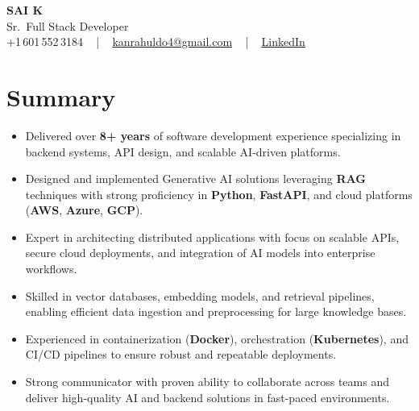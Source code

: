 \documentclass[letterpaper,11pt]{article}
\newcommand{\resumeItem}[1]{
  \item\footnotesize{
    {#1 \vspace{-2pt}}
  }
}
\newcommand{\resumeItemListStart}{\begin{itemize}[leftmargin=*]}
\newcommand{\resumeItemListEnd}{\end{itemize}\vspace{-5pt}}
\begin{document}
\begin{center}
    {\fontsize{14pt}{12pt}\selectfont \textbf{\MakeUppercase{Sai K}}}\\ \vspace{2pt}
    \fontsize{10pt}{12pt}\selectfont Sr.\ Full Stack Developer\\ \vspace{2pt}
    \fontsize{10pt}{12pt}\selectfont +1\,601\,552\,3184 ~ | ~
    \href{mailto:kanrahuldo4@gmail.com}{kanrahuldo4@gmail.com} ~ | ~
    \href{https://www.linkedin.com/in/srrrk/}{\color{blue}\underline{LinkedIn}}
    \vspace{-10pt}
\end{center}

\section{Summary}
\fontsize{9pt}{10pt}\selectfont
\resumeItemListStart
  \resumeItem{Delivered over \textbf{8+ years} of software development experience specializing in backend systems, API design, and scalable AI-driven platforms.}
  \resumeItem{Designed and implemented Generative AI solutions leveraging \textbf{RAG} techniques with strong proficiency in \textbf{Python}, \textbf{FastAPI}, and cloud platforms (\textbf{AWS}, \textbf{Azure}, \textbf{GCP}).}
  \resumeItem{Expert in architecting distributed applications with focus on scalable APIs, secure cloud deployments, and integration of AI models into enterprise workflows.}
  \resumeItem{Skilled in vector databases, embedding models, and retrieval pipelines, enabling efficient data ingestion and preprocessing for large knowledge bases.}
  \resumeItem{Experienced in containerization (\textbf{Docker}), orchestration (\textbf{Kubernetes}), and CI/CD pipelines to ensure robust and repeatable deployments.}
  \resumeItem{Strong communicator with proven ability to collaborate across teams and deliver high-quality AI and backend solutions in fast-paced environments.}
\resumeItemListEnd
\vspace{-6pt}

\end{document}
